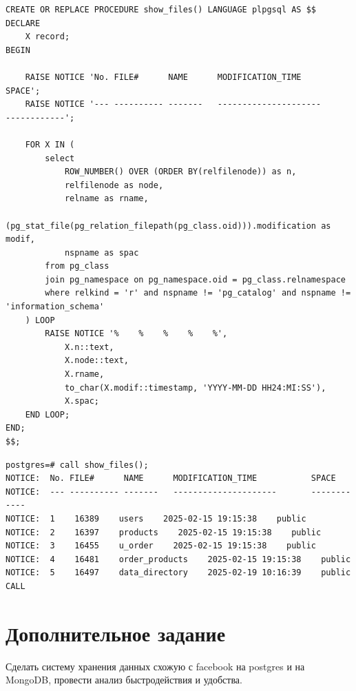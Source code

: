 \documentclass{article}
\begin{document}
\begin{lstlisting}[caption={script.sql}, label={lst:example}]
CREATE OR REPLACE PROCEDURE show_files() LANGUAGE plpgsql AS $$
DECLARE
    X record;
BEGIN

    RAISE NOTICE 'No. FILE#      NAME      MODIFICATION_TIME           SPACE';
    RAISE NOTICE '--- ---------- -------   ---------------------       ------------';

    FOR X IN (
        select 
            ROW_NUMBER() OVER (ORDER BY(relfilenode)) as n, 
            relfilenode as node, 
            relname as rname, 
            (pg_stat_file(pg_relation_filepath(pg_class.oid))).modification as modif, 
            nspname as spac
        from pg_class 
        join pg_namespace on pg_namespace.oid = pg_class.relnamespace 
        where relkind = 'r' and nspname != 'pg_catalog' and nspname != 'information_schema'
    ) LOOP
        RAISE NOTICE '%    %    %    %    %',
            X.n::text,
            X.node::text,
            X.rname,
            to_char(X.modif::timestamp, 'YYYY-MM-DD HH24:MI:SS'),
            X.spac;
    END LOOP;
END;
$$;
\end{lstlisting}

\begin{lstlisting}[caption={kitty}, label={lst:example}]
postgres=# call show_files();
NOTICE:  No. FILE#      NAME      MODIFICATION_TIME           SPACE
NOTICE:  --- ---------- -------   ---------------------       ------------
NOTICE:  1    16389    users    2025-02-15 19:15:38    public
NOTICE:  2    16397    products    2025-02-15 19:15:38    public
NOTICE:  3    16455    u_order    2025-02-15 19:15:38    public
NOTICE:  4    16481    order_products    2025-02-15 19:15:38    public
NOTICE:  5    16497    data_directory    2025-02-19 10:16:39    public
CALL
\end{lstlisting}

\section*{Дополнительное задание}

Сделать систему хранения данных схожую с facebook на postgres и на MongoDB, провести анализ быстродействия и удобства.
\end{document}
